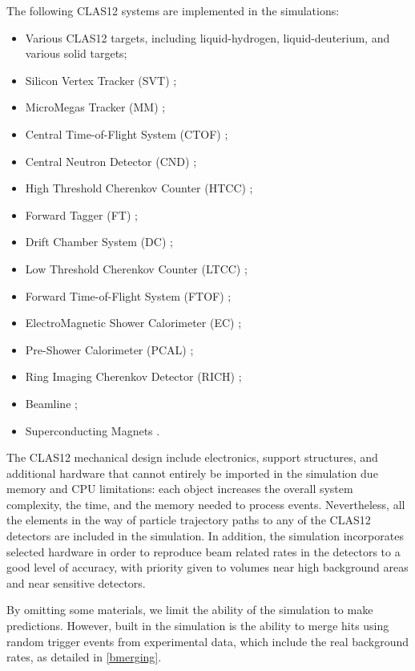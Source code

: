 The following CLAS12 systems are implemented in the simulations:

\begin{itemize}
\item Various CLAS12 targets, including liquid-hydrogen, liquid-deuterium, and various solid targets;
\item Silicon Vertex Tracker (SVT) \cite{svt-nim};
\item MicroMegas Tracker (MM) \cite{mm-nim};
\item Central Time-of-Flight System (CTOF) \cite{ctof-nim};
\item Central Neutron Detector (CND) \cite{cnd-nim};
\item High Threshold Cherenkov Counter (HTCC) \cite{htcc-nim};
\item Forward Tagger (FT) \cite{ft-nim};
\item Drift Chamber System (DC) \cite{dc-nim};
\item Low Threshold Cherenkov Counter (LTCC) \cite{ltcc-nim};
\item Forward Time-of-Flight System (FTOF) \cite{ftof-nim};
\item ElectroMagnetic Shower Calorimeter (EC) \cite{Amarian:2001zs};
\item Pre-Shower Calorimeter (PCAL) \cite{ec-nim};
\item Ring Imaging Cherenkov Detector (RICH) \cite{rich-nim};
\item Beamline \cite{beamline-nim};
\item Superconducting Magnets \cite{magnets-nim}.
\end{itemize}

The CLAS12 mechanical design include electronics, support structures, and additional hardware that cannot
entirely be imported in the simulation due memory and CPU limitations: each object increases the overall
system complexity, the time, and the memory needed to process events. Nevertheless, all the elements in
the way of particle trajectory paths to any of the CLAS12 detectors are included in the simulation.
In addition, the simulation incorporates selected hardware in order to reproduce beam related
rates in the detectors to a good level of accuracy, with priority given to volumes near high background
areas and near sensitive detectors.

By omitting some materials, we limit the ability of the simulation to make predictions. However, built in the
simulation is the ability to merge hits using random trigger events from experimental data, which include the
real background rates, as detailed in \ref{bmerging}.

